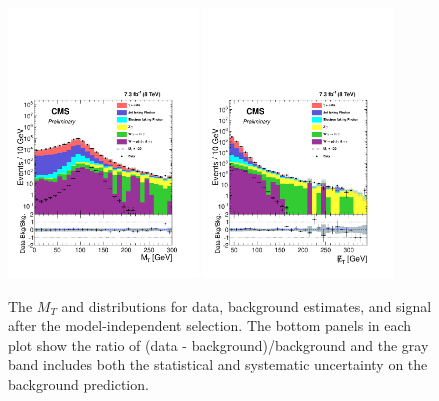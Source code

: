\begin{figure}[H]                  
\centering   
{\label{fig:QCDPt}\includegraphics[width=0.45\textwidth]{PAS_Plots2/StackedHisto_MT.pdf}}                           
{\label{fig:QCDMET}\includegraphics[width=0.45\textwidth]{PAS_Plots2/StackedHisto_MET.pdf}}                         
\caption{The $M_{T}$ and \met distributions for data, background estimates, and signal after the model-independent selection. The bottom panels in each plot show the ratio of (data - background)/background and the gray band includes both the statistical and systematic uncertainty on the background prediction. }                           
\label{fig:modelInd}                     
\end{figure} 


